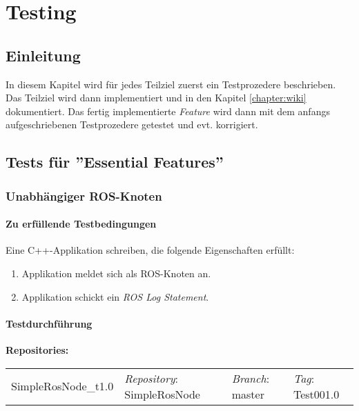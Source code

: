 
\chapter{Testing}
\label{chapter:testing}
\section{Einleitung}
In diesem Kapitel wird für jedes Teilziel zuerst ein Testprozedere beschrieben.
Das Teilziel wird dann implementiert und in den Kapitel \ref{chapter:wiki} dokumentiert. %
Das fertig implementierte \textit{Feature} wird dann mit dem anfangs aufgeschriebenen Testprozedere getestet und evt. korrigiert.


\section{Tests für ''Essential Features''}
\subsection{Unabhängiger ROS-Knoten}
\subsubsection{Zu erfüllende Testbedingungen}
Eine C++-Applikation schreiben, die folgende Eigenschaften erfüllt:
\begin{enumerate}
\item Applikation meldet sich als ROS-Knoten an.
\item Applikation schickt ein \textit{ROS Log Statement}.
\end{enumerate}

\subsubsection{Testdurchführung}
\textbf{Repositories:} \\
\begin{tabular}
  { l						| l			 							l								 l								}
  SimpleRosNode\_t1.0		& \textit{Repository}: SimpleRosNode	& \textit{Branch}: master		& \textit{Tag}: Test001.0 		\\
\end{tabular}

